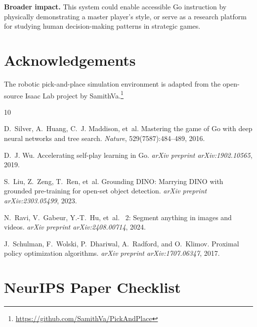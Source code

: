 \documentclass{article}
\begin{document}
\textbf{Broader impact.} This system could enable accessible Go instruction by physically demonstrating a master player's style, or serve as a research platform for studying human decision-making patterns in strategic games.

\section*{Acknowledgements}

The robotic pick-and-place simulation environment is adapted from the open-source Isaac Lab project by SamithVa.\footnote{\url{https://github.com/SamithVa/PickAndPlace}}


\begin{thebibliography}{10}

D.~Silver, A.~Huang, C.~J. Maddison, et~al.
\newblock Mastering the game of {G}o with deep neural networks and tree search.
\newblock \emph{Nature}, 529(7587):484--489, 2016.

D.~J. Wu.
\newblock Accelerating self-play learning in {G}o.
\newblock \emph{arXiv preprint arXiv:1902.10565}, 2019.

S.~Liu, Z.~Zeng, T.~Ren, et~al.
\newblock Grounding {DINO}: Marrying {DINO} with grounded pre-training for open-set object detection.
\newblock \emph{arXiv preprint arXiv:2303.05499}, 2023.

N.~Ravi, V.~Gabeur, Y.-T.~Hu, et~al.
~2: Segment anything in images and videos.
\newblock \emph{arXiv preprint arXiv:2408.00714}, 2024.

J.~Schulman, F.~Wolski, P.~Dhariwal, A.~Radford, and O.~Klimov.
\newblock Proximal policy optimization algorithms.
\newblock \emph{arXiv preprint arXiv:1707.06347}, 2017.

\end{thebibliography}

\newpage
\section*{NeurIPS Paper Checklist}
\end{document}
